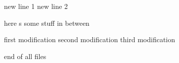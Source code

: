 new line 1
new line 2


here s some stuff in between

first modification
second modification
third modification

end of all files
